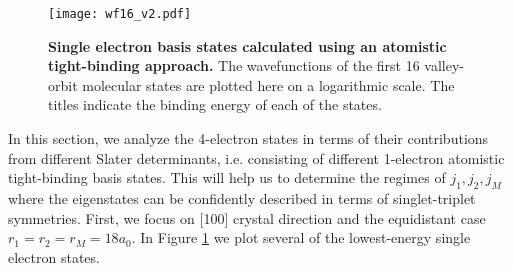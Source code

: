 \begin{figure}[htbp]
    \centering
    \texttt{[image: wf16\_v2.pdf]}
    \caption{\textbf{Single electron basis states calculated using an atomistic tight-binding approach.} The wavefunctions of the first 16 valley-orbit molecular states are plotted here on a logarithmic scale. The titles indicate the binding energy of each of the states.}
    \label{fig:basis_states}
\end{figure}

In this section, we analyze the 4-electron states in terms of their contributions from different Slater determinants, i.e. consisting of different 1-electron atomistic tight-binding basis states. This will help us to determine the regimes of $j_1,j_2,j_M$ where the eigenstates can be confidently described in terms of singlet-triplet symmetries. First, we focus on [100] crystal direction and the equidistant case $r_1=r_2=r_M=18a_0$. In Figure \ref{fig:basis_states} we plot several of the lowest-energy single electron states. 

